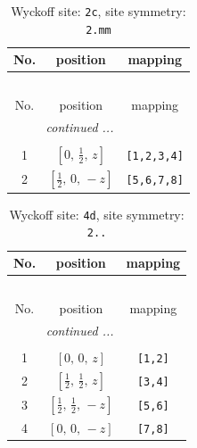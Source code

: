 \documentclass[fleqn,8pt]{jsarticle}
\begin{document}
\renewcommand{\arraystretch}{1.2}
\begin{longtable}{ccc}
\caption{Wyckoff site: {\tt 2c}, site symmetry: {\tt 2.mm}}
 \\
 \hline \hline
No. & position & mapping \\ \hline \endfirsthead

\multicolumn{2}{l}{\tablename\ \thetable{}} \\
 \hline \hline
No. & position & mapping \\ \hline \endhead

 \hline \hline
\multicolumn{2}{r}{\footnotesize\it continued ...} \\ \endfoot

 \hline \hline
\multicolumn{2}{r}{} \\ \endlastfoot

1 & $\left[ 0,\, \frac{1}{2},\, z \right]$ & {\tt [1,2,3,4]} \\ \hline
2 & $\left[ \frac{1}{2},\, 0,\, - z \right]$ & {\tt [5,6,7,8]} \\
\end{longtable}
\renewcommand{\arraystretch}{1.2}
\begin{longtable}{ccc}
\caption{Wyckoff site: {\tt 4d}, site symmetry: {\tt 2..}}
 \\
 \hline \hline
No. & position & mapping \\ \hline \endfirsthead

\multicolumn{2}{l}{\tablename\ \thetable{}} \\
 \hline \hline
No. & position & mapping \\ \hline \endhead

 \hline \hline
\multicolumn{2}{r}{\footnotesize\it continued ...} \\ \endfoot

 \hline \hline
\multicolumn{2}{r}{} \\ \endlastfoot

1 & $\left[ 0,\, 0,\, z \right]$ & {\tt [1,2]} \\ \hline
2 & $\left[ \frac{1}{2},\, \frac{1}{2},\, z \right]$ & {\tt [3,4]} \\ \hline
3 & $\left[ \frac{1}{2},\, \frac{1}{2},\, - z \right]$ & {\tt [5,6]} \\ \hline
4 & $\left[ 0,\, 0,\, - z \right]$ & {\tt [7,8]} \\
\end{longtable}
\renewcommand{\arraystretch}{1.2}
\end{document}
